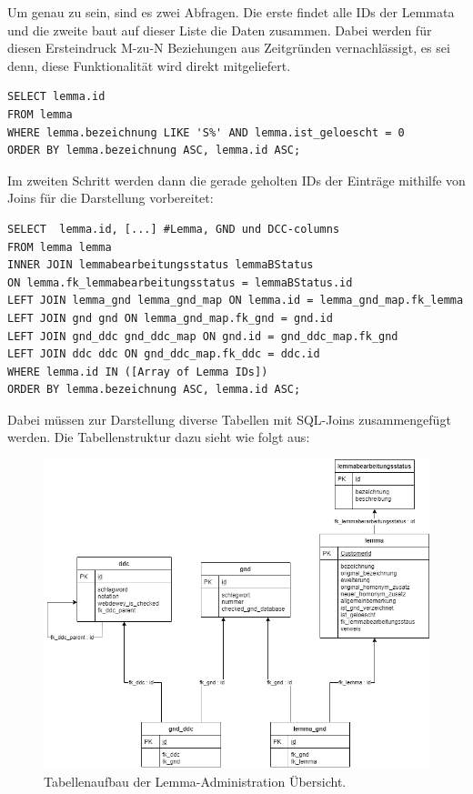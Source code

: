 \newpage

Um genau zu sein, sind es zwei Abfragen. Die erste findet alle IDs der Lemmata und die zweite baut auf dieser Liste die Daten zusammen. 
Dabei werden für diesen Ersteindruck M-zu-N Beziehungen aus Zeitgründen vernachlässigt, es sei denn, diese Funktionalität wird direkt mitgeliefert.

\lstset{language=SQL}
\begin{lstlisting}[frame=single, caption=Abfrage aller Lemmata mit den Buchstaben S (Part 1),captionpos=b] 
SELECT lemma.id
FROM lemma
WHERE lemma.bezeichnung LIKE 'S%' AND lemma.ist_geloescht = 0
ORDER BY lemma.bezeichnung ASC, lemma.id ASC;
\end{lstlisting}

Im zweiten Schritt werden dann die gerade geholten IDs der Einträge mithilfe von Joins für die Darstellung vorbereitet:

\lstset{language=SQL}
\begin{lstlisting}[frame=single, label={lst:sqlQuery}, caption=Abfrage aller Lemmata mit den Buchstaben S (Part 2),captionpos=b] 
SELECT  lemma.id, [...] #Lemma, GND und DCC-columns        
FROM lemma lemma
INNER JOIN lemmabearbeitungsstatus lemmaBStatus
ON lemma.fk_lemmabearbeitungsstatus = lemmaBStatus.id
LEFT JOIN lemma_gnd lemma_gnd_map ON lemma.id = lemma_gnd_map.fk_lemma
LEFT JOIN gnd gnd ON lemma_gnd_map.fk_gnd = gnd.id
LEFT JOIN gnd_ddc gnd_ddc_map ON gnd.id = gnd_ddc_map.fk_gnd
LEFT JOIN ddc ddc ON gnd_ddc_map.fk_ddc = ddc.id
WHERE lemma.id IN ([Array of Lemma IDs])
ORDER BY lemma.bezeichnung ASC, lemma.id ASC;
\end{lstlisting}

Dabei müssen zur Darstellung diverse Tabellen mit SQL-Joins zusammengefügt werden.
Die Tabellenstruktur dazu sieht wie folgt aus:

\begin{figure}
	\centering
	\includegraphics[width=0.8\linewidth]{images/structure_lemmaadministration.png}
	\caption{Tabellenaufbau der Lemma-Administration Übersicht.}
	\label{img:lAdminStructure}
\end{figure}

\newpage